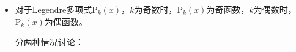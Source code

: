 \documentclass[fontset=windows]{ctexart}
\begin{document}
\begin{itemize}
\begin{align*}
        &= -\left.\frac{1}{l(l+1)}(1+x)\mathrm{P}_l(x)\right|_{-1}^{1} + \frac{1}{l(l+1)}\int_{-1}^{1}\mathrm{P}_l(x)\,\mathrm{d}(1+x) \\
        &= -\left.\frac{1}{l(l+1)}(1+x)\mathrm{P}_l(x)\right|_{-1}^{1} + \frac{1}{l(l+1)}\int_{-1}^{1}\mathrm{P}_l(x)\,\mathrm{d}x \\
        &= -\frac{2}{l(l+1)}
    \end{align*}
    其中利用了：
    \[
    \mathrm{P}_l(1) = 1,\qquad \mathrm{P}_l(-1) = (-1)^l
    \]
    \[
    \int_{-1}^{1}x^n\mathrm{P}_l(x)\,\mathrm{d}x = 0,\qquad n<l
    \]
    综上：
    \[
    \int_{-1}^{1}\mathrm{P}_l(x)\ln(1-x)\,\mathrm{d}x =
    \left\{
    \begin{aligned}
        &\ 2\ln2-2,\qquad &l=0 \\
        &\ -\frac{2}{l(l+1)},\qquad &l>0
    \end{aligned}
    \right.
    \]
    \bigskip

    \item[3.(3)]
    对于Legendre多项式$\mathrm{P}_k(x)$，$k$为奇数时，$\mathrm{P}_k(x)$为奇函数，$k$为偶数时，$\mathrm{P}_k(x)$为偶函数。

    分两种情况讨论：


\end{itemize}
\end{document}
